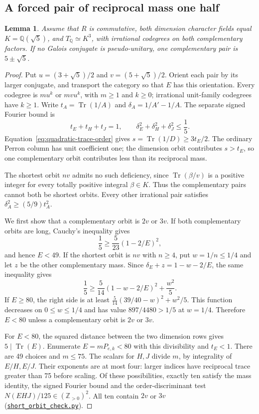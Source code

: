 \documentclass[11pt,reqno]{amsart}
\newcommand{\codefile}[1]{\href{https://github.com/sebastienpalcoux/grothendieck-ring-classification/blob/d5750105bb5758f3ad38d2e5464dfcc12c019816/supplements/rank6/sphericality/#1}{\nolinkurl{#1}}}
\newtheorem{lemma}[theorem]{Lemma}
\theoremstyle{remark}\newtheorem{remark}[theorem]{Remark}
\numberwithin{equation}{section}
\begin{document}
\subsection{A forced pair of reciprocal mass one half}
\begin{lemma}\label{lem:force-golden-short}
Assume that $R$ is commutative, both dimension character fields equal $K=\mathbb Q(\sqrt5)$, and $T_{\mathbb Q}\simeq K^3$, with irrational codegrees on both complementary factors. If no Galois conjugate is pseudo-unitary, one complementary pair is $5\pm\sqrt5$.
\end{lemma}
\begin{proof}
Put $u=(3+\sqrt5)/2$ and $v=(5+\sqrt5)/2$.
Orient each pair by its larger conjugate, and transport the category
so that $E$ has this orientation. Every codegree is $mu^k$ or
$mvu^k$, with $m\ge1$ and $k\ge0$; irrational unit-family
codegrees have $k\ge1$.
Write $t_A=\operatorname{Tr}(1/A)$ and
$\delta_A=1/A'-1/A$.
The separate signed Fourier bound is
\[
 t_E+t_H+t_J=1,\qquad
 \delta_E^2+\delta_H^2+\delta_J^2\le\frac15.
\]
Equation~\eqref{eq:quadratic-trace-order} gives $s=\operatorname{Tr}(1/D)\ge3t_E/2$.
The ordinary Perron column has unit coefficient one; the dimension
orbit contributes $s>t_E$, so one complementary orbit contributes
less than its reciprocal mass.

The shortest orbit $nv$ admits no such deficiency, since
$\operatorname{Tr}(\beta/v)$ is a positive integer for every totally
positive integral $\beta\in K$. Thus the complementary pairs
cannot both be shortest orbits. Every other irrational pair satisfies
$\delta_A^2\ge(5/9)t_A^2$.

We first show that a complementary orbit is $2v$ or $3v$.
If both complementary orbits are long, Cauchy's inequality gives
\[
 \frac15\ge\frac5{23}(1-2/E)^2,
\]
and hence $E<49$. If the shortest orbit is $nv$ with $n\ge4$,
put $w=1/n\le1/4$ and let $z$ be the other complementary mass.
Since $\delta_E+z=1-w-2/E$, the same inequality gives
\[
 \frac15\ge\frac5{14}(1-w-2/E)^2+\frac{w^2}{5}.
\]
If $E\ge80$, the right side is at least
$\frac5{14}(39/40-w)^2+w^2/5$. This function decreases on
$0\le w\le1/4$ and has value $897/4480>1/5$ at $w=1/4$.
Therefore $E<80$ unless a complementary orbit is $2v$ or $3v$.

For $E<80$, the squared distance between the two dimension rows
gives $5\mid\operatorname{Tr}(E)$. Enumerate $E=mP_{e,k}<80$
with this divisibility and $t_E<1$. There are 49 choices and $m\le75$.
The scalars for $H,J$ divide $m$, by integrality of $E/H,E/J$.
Their exponents are at most four: larger indices have reciprocal
trace greater than 75 before scaling. Of these possibilities, exactly
ten satisfy the mass identity, the signed Fourier bound and the
order-discriminant test $N(EHJ)/125\in(\mathbb Z_{>0})^2$.
All ten contain $2v$ or $3v$ (\codefile{short_orbit_check.py}).


\end{proof}
\end{document}
